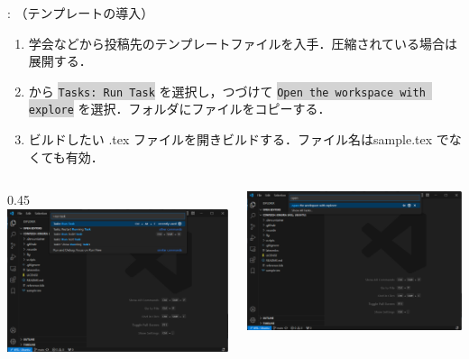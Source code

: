 \documentclass[aspectratio=169,dvipdfmx,cjk]{beamer}
\newcommand{\cmdline}[1]{
    \colorbox{lightgray}{\lstinline[style=command]{#1}}
}
\begin{document}
\begin{frame}{\insertsection \thesubsection: \insertsubsection （テンプレートの導入）}
  \begin{enumerate}
    \item 学会などから投稿先のテンプレートファイルを入手．圧縮されている場合は展開する．
    \item {} から \cmdline{Tasks: Run Task} を選択し，つづけて\cmdline{Open the workspace with explore} を選択．フォルダにファイルをコピーする．
    \item ビルドしたい .tex ファイルを開きビルドする．ファイル名はsample.tex でなくても有効．
  \end{enumerate}
  \begin{columns}
    \begin{column}{0.45\textwidth}
        \includegraphics[width=1.0\linewidth]{fig/run-task.png}
    \end{column}
    \begin{column}{0.45\textwidth}
      \includegraphics[width=1.0\linewidth]{fig/open-workspace.png}
    \end{column}
  \end{columns}
\end{frame}
\end{document}
